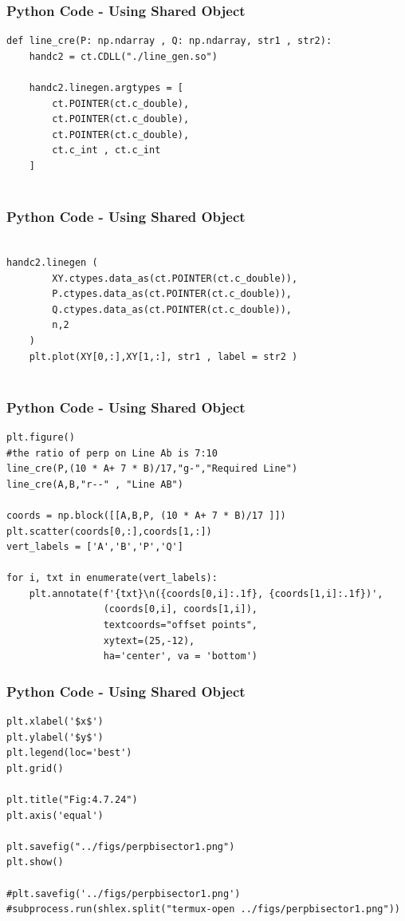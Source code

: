 \documentclass{beamer}
\begin{document}
\begin{frame}[fragile]
    \frametitle{Python Code - Using Shared Object}
    \begin{lstlisting}
def line_cre(P: np.ndarray , Q: np.ndarray, str1 , str2):
    handc2 = ct.CDLL("./line_gen.so")

    handc2.linegen.argtypes = [
        ct.POINTER(ct.c_double),
        ct.POINTER(ct.c_double),
        ct.POINTER(ct.c_double),
        ct.c_int , ct.c_int
    ]
    
\end{lstlisting}
\end{frame}
\begin{frame}[fragile]
    \frametitle{Python Code - Using Shared Object}
    \begin{lstlisting}
    
handc2.linegen (
        XY.ctypes.data_as(ct.POINTER(ct.c_double)),
        P.ctypes.data_as(ct.POINTER(ct.c_double)),
        Q.ctypes.data_as(ct.POINTER(ct.c_double)),
        n,2
    )
    plt.plot(XY[0,:],XY[1,:], str1 , label = str2 )
    
    \end{lstlisting}
\end{frame}

\begin{frame}[fragile]
    \frametitle{Python Code - Using Shared Object}
    \begin{lstlisting}
plt.figure()
#the ratio of perp on Line Ab is 7:10 
line_cre(P,(10 * A+ 7 * B)/17,"g-","Required Line")
line_cre(A,B,"r--" , "Line AB")

coords = np.block([[A,B,P, (10 * A+ 7 * B)/17 ]])
plt.scatter(coords[0,:],coords[1,:])
vert_labels = ['A','B','P','Q']

for i, txt in enumerate(vert_labels):
    plt.annotate(f'{txt}\n({coords[0,i]:.1f}, {coords[1,i]:.1f})',
                 (coords[0,i], coords[1,i]),
                 textcoords="offset points",
                 xytext=(25,-12),
                 ha='center', va = 'bottom')
\end{lstlisting}
\end{frame}

\begin{frame}[fragile]
    \frametitle{Python Code - Using Shared Object}
    \begin{lstlisting}
plt.xlabel('$x$')
plt.ylabel('$y$')
plt.legend(loc='best')
plt.grid()

plt.title("Fig:4.7.24")
plt.axis('equal')

plt.savefig("../figs/perpbisector1.png")
plt.show()

#plt.savefig('../figs/perpbisector1.png')
#subprocess.run(shlex.split("termux-open ../figs/perpbisector1.png"))

\end{lstlisting}
\end{frame}
\end{document}
